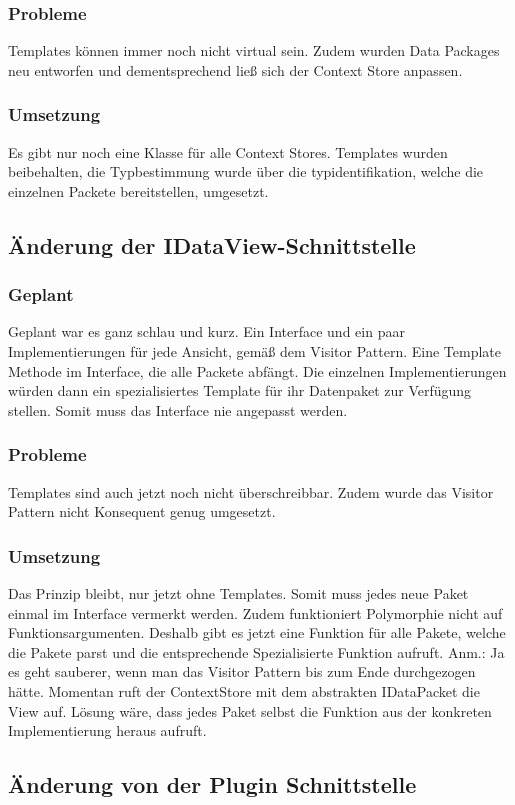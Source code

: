 \subsubsection{Probleme}
Templates können immer noch nicht virtual sein. Zudem wurden Data Packages neu entworfen und dementsprechend ließ sich der Context Store anpassen.
\subsubsection{Umsetzung}
Es gibt nur noch eine Klasse für alle Context Stores. Templates wurden beibehalten, die Typbestimmung wurde über die typidentifikation, welche die einzelnen Packete bereitstellen, umgesetzt.
\subsection{Änderung der IDataView-Schnittstelle}
\subsubsection{Geplant}
Geplant war es ganz schlau und kurz. Ein Interface und ein paar Implementierungen für jede Ansicht, gemäß dem Visitor Pattern. Eine Template Methode im Interface, die alle Packete abfängt. Die einzelnen Implementierungen würden dann ein spezialisiertes Template für ihr Datenpaket zur Verfügung stellen. Somit muss das Interface nie angepasst werden.
\subsubsection{Probleme}
Templates sind auch jetzt noch nicht überschreibbar. Zudem wurde das Visitor Pattern nicht Konsequent genug umgesetzt.
\subsubsection{Umsetzung}
Das Prinzip bleibt, nur jetzt ohne Templates. Somit muss jedes neue Paket einmal im Interface vermerkt werden. Zudem funktioniert Polymorphie nicht auf Funktionsargumenten. Deshalb gibt es jetzt eine Funktion für alle Pakete, welche die Pakete parst und die entsprechende Spezialisierte Funktion aufruft. Anm.: Ja es geht sauberer, wenn man das Visitor Pattern bis zum Ende durchgezogen hätte. Momentan ruft der ContextStore mit dem abstrakten IDataPacket die View auf. Lösung wäre, dass jedes Paket selbst die Funktion aus der konkreten Implementierung heraus aufruft.
\subsection{Änderung von der Plugin Schnittstelle}
